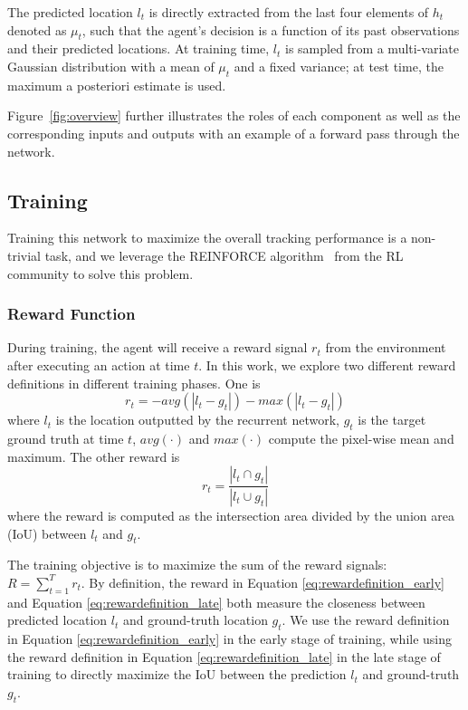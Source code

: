 \documentclass[10pt,twocolumn,letterpaper]{article}
\begin{document}
The predicted location $l_t$ is directly extracted from the last four elements of $h_t$ denoted as $\mu_t$, such that the agent's decision is a function of its past observations and their predicted locations. At training time, $l_t$ is sampled from a multi-variate Gaussian distribution with a mean of $\mu_t$ and a fixed variance; at test time, the maximum a posteriori estimate is used. 

Figure~\ref{fig:overview} further illustrates the roles of each component as well as the corresponding inputs and outputs with an example of a forward pass through the network.
\subsection{Training}
\label{subsec:training}

Training this network to maximize the overall tracking performance is a non-trivial task, and we leverage the REINFORCE algorithm~\cite{williams1992simple} from the RL community to solve this problem.

\subsubsection{Reward Function}

During training, the agent will receive a reward signal $r_t$ from the environment after executing an action at time $t$. In this work, we explore two different reward definitions in different training phases. One is 
\begin{equation}
	r_t=-avg(|l_t-g_t|)-max(|l_t-g_t|)
    \label{eq:rewardefinition_early}
\end{equation}
where $l_t$ is the location outputted by the recurrent network, $g_t$ is the target ground truth at time $t$, $avg(\cdot)$ and $max(\cdot)$ compute the pixel-wise mean and maximum. The other reward is 
\begin{equation}
	r_t=\frac{|l_t\cap g_t|}{|l_t\cup g_t|}
    \label{eq:rewardefinition_late}
\end{equation}
where the reward is computed as the intersection area divided by the union area (IoU) between $l_t$ and $g_t$. 

The training objective is to maximize the sum of the reward signals: $R=\sum_{t=1}^{T}r_t$. By definition, the reward in Equation \ref{eq:rewardefinition_early} and Equation \ref{eq:rewardefinition_late} both measure the closeness between predicted location $l_t$ and ground-truth location $g_t$. We use the reward definition in Equation \ref{eq:rewardefinition_early} in the early stage of training, while using the reward definition in Equation \ref{eq:rewardefinition_late} in the late stage of training to directly maximize the IoU  between the prediction $l_t$ and ground-truth $g_t$.
\end{document}
